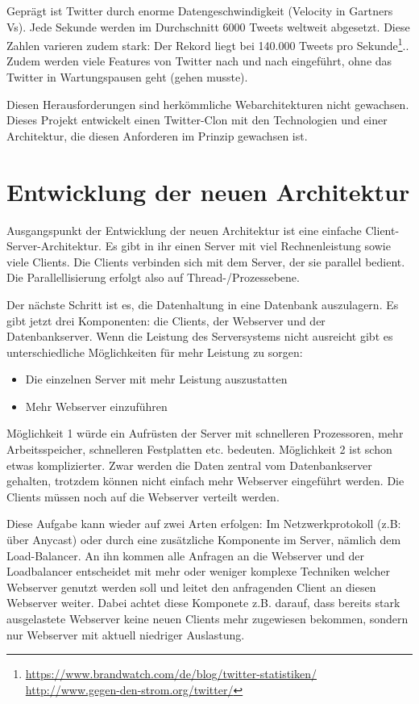 Geprägt ist Twitter durch enorme Datengeschwindigkeit (Velocity in Gartners Vs). Jede Sekunde werden im
Durchschnitt 6000 Tweets weltweit abgesetzt. Diese Zahlen varieren zudem
stark: Der Rekord liegt bei 140.000 Tweets pro Sekunde\footnote{\url{https://www.brandwatch.com/de/blog/twitter-statistiken/}
\url{http://www.gegen-den-strom.org/twitter/}}.. Zudem werden viele Features von Twitter nach und nach eingeführt,
ohne das Twitter in Wartungspausen geht (gehen musste).

Diesen Herausforderungen sind herkömmliche Webarchitekturen nicht gewachsen. Dieses Projekt entwickelt einen Twitter-Clon
mit den Technologien und einer Architektur, die diesen Anforderen im Prinzip gewachsen ist.

\section{Entwicklung der neuen Architektur}
Ausgangspunkt der Entwicklung der neuen Architektur ist eine einfache Client-Server-Architektur. Es gibt in ihr einen Server
mit viel Rechnenleistung sowie viele Clients. Die Clients verbinden sich mit dem Server, der sie parallel bedient. Die Parallellisierung
erfolgt also auf Thread-/Prozessebene.

Der nächste Schritt ist es, die Datenhaltung in eine Datenbank auszulagern. Es gibt jetzt drei Komponenten: die Clients,
der Webserver und der Datenbankserver. Wenn die Leistung des Serversystems nicht ausreicht gibt es unterschiedliche Möglichkeiten
für mehr Leistung zu sorgen:
\begin{itemize}
  \item Die einzelnen Server mit mehr Leistung auszustatten
  \item Mehr Webserver einzuführen
\end{itemize}
Möglichkeit 1 würde ein Aufrüsten der Server mit schnelleren Prozessoren, mehr Arbeitsspeicher, schnelleren Festplatten etc.
bedeuten. Möglichkeit 2 ist schon etwas komplizierter. Zwar werden die Daten zentral vom Datenbankserver gehalten,
trotzdem können nicht einfach mehr Webserver eingeführt werden. Die Clients müssen noch auf die Webserver verteilt werden.

Diese Aufgabe kann wieder auf zwei Arten erfolgen: Im Netzwerkprotokoll (z.B: über Anycast) oder durch eine zusätzliche
Komponente im Server, nämlich dem Load-Balancer. An ihn kommen alle Anfragen an die Webserver und der Loadbalancer
entscheidet mit mehr oder weniger komplexe Techniken welcher Webserver genutzt werden soll und leitet
den anfragenden Client an diesen Webserver weiter. Dabei achtet diese Komponete z.B. darauf, dass bereits stark
ausgelastete Webserver keine neuen Clients mehr zugewiesen bekommen, sondern nur Webserver mit aktuell
niedriger Auslastung.


